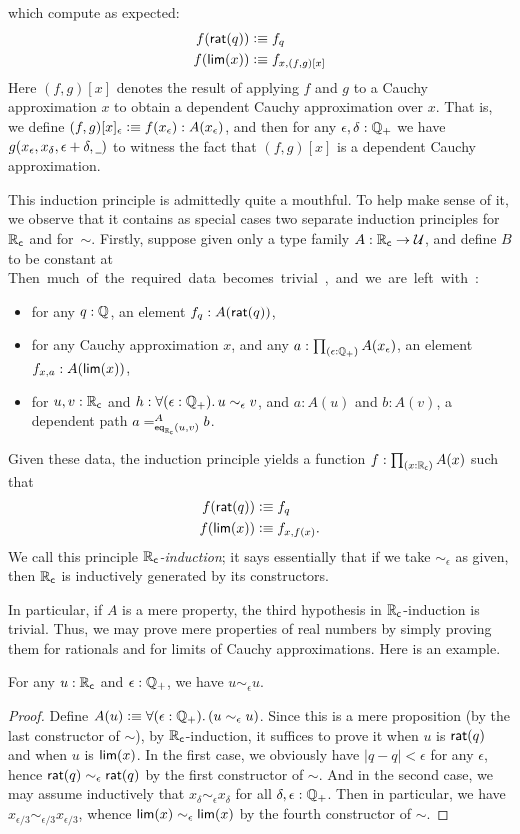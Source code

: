 which compute as expected:
\begin{align*}
  f(\rcrat(q)) &\defeq f_q\\
  f(\rclim(x)) &\defeq f_{x,(f,g)[x]}
\end{align*}
Here $(f,g)[x]$ denotes the result of applying $f$ and $g$ to a Cauchy approximation $x$ to obtain a dependent Cauchy approximation over $x$.
That is, we define $(f,g)[x]_\epsilon \defeq f(x_\epsilon) : A(x_\epsilon)$, and then for any $\epsilon,\delta:\Qp$ we have $g(x_\epsilon,x_\delta,\epsilon+\delta,\blank)$ to witness the fact that $(f,g)[x]$ is a dependent Cauchy approximation.

This induction principle is admittedly quite a mouthful.
To help make sense of it, we observe that it contains as special cases two separate induction principles for~$\RC$ and for~$\sim$.
Firstly, suppose given only a type family $A:\RC\to\type$, and define $B$ to be constant at \unit.
Then much of the required data becomes trivial, and we are left with:
\begin{itemize}
\item for any $q : \Q$, an element $f_q:A(\rcrat(q))$,
\item for any Cauchy approximation $x$, and any $a:\prd{\epsilon:\Qp} A(x_\epsilon)$, an element $f_{x,a}:A(\rclim(x))$,
\item for $u, v : \RC$ and $h:\fall{\epsilon : \Qp} u \sim_\epsilon v$, and $a:A(u)$ and $b:A(v)$, a dependent path $\dpath{A}{\rceq(u,v)}{a}{b}$.
\end{itemize}
Given these data, the induction principle yields a function $f:\prd{x:\RC} A(x)$ such that
\begin{align*}
  f(\rcrat(q)) &\defeq f_q\\
  f(\rclim(x)) &\defeq f_{x,f(x)}.
\end{align*}
We call this principle \emph{$\RC$-induction}; it says essentially that if we take $\sim_\epsilon$ as given, then $\RC$ is inductively generated by its constructors.

In particular, if $A$ is a mere property, the third hypothesis in $\RC$-induction is trivial.
Thus, we may prove mere properties of real numbers by simply proving them for rationals and for limits of Cauchy approximations.
Here is an example.

\begin{lem}
  For any $u:\RC$ and $\epsilon:\Qp$, we have $u\sim_\epsilon u$.
\end{lem}
\begin{proof}
  Define $A(u) \defeq \fall{\epsilon:\Qp} (u\sim_\epsilon u)$.
  Since this is a mere proposition (by the last constructor of $\sim$), by $\RC$-induction, it suffices to prove it when $u$ is $\rcrat(q)$ and when $u$ is $\rclim(x)$.
  In the first case, we obviously have $|q-q|<\epsilon$ for any $\epsilon$, hence $\rcrat(q) \sim_\epsilon \rcrat(q)$ by the first constructor of $\sim$.
  And in the second case, we may assume inductively that $x_\delta \sim_\epsilon x_\delta$ for all $\delta,\epsilon:\Qp$.
  Then in particular, we have $x_{\epsilon/3} \sim_{\epsilon/3} x_{\epsilon/3}$, whence $\rclim(x) \sim_{\epsilon} \rclim(x)$ by the fourth constructor of $\sim$.
\end{proof}

